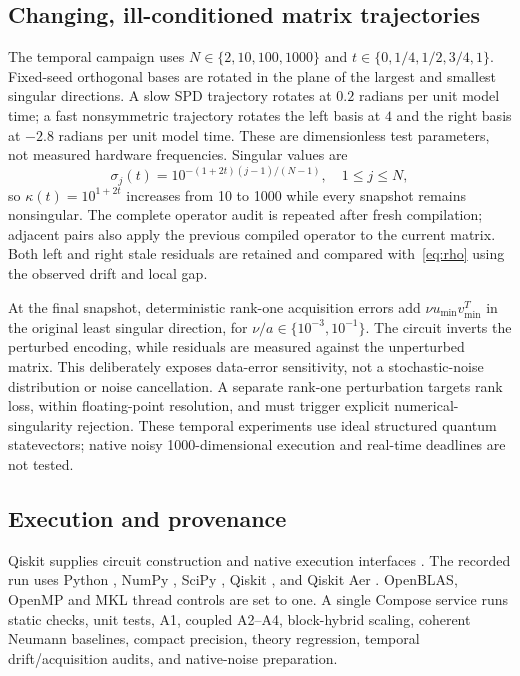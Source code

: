 \documentclass[journal]{IEEEtran}
\begin{document}
\subsection{Changing, ill-conditioned matrix trajectories}
The temporal campaign uses $N\in\{2,10,100,1000\}$ and
$t\in\{0,1/4,1/2,3/4,1\}$. Fixed-seed orthogonal bases are rotated in
the plane of the largest and smallest singular directions. A slow SPD
trajectory rotates at $0.2$ radians per unit model time; a fast
nonsymmetric trajectory rotates the left basis at $4$ and the right basis
at $-2.8$ radians per unit model time. These are dimensionless test
parameters, not measured hardware frequencies. Singular values are
\begin{equation}
 \sigma_j(t)=10^{-(1+2t)(j-1)/(N-1)},\quad 1\leq j\leq N,
 \label{eq:temporalspectrum}
\end{equation}
so $\kappa(t)=10^{1+2t}$ increases from 10 to 1000 while every snapshot
remains nonsingular. The complete operator audit is repeated after fresh
compilation; adjacent pairs also apply the previous compiled operator
to the current matrix. Both left and right stale residuals are retained
and compared with~\eqref{eq:rho} using the observed drift and local gap.

At the final snapshot, deterministic rank-one acquisition errors add
$\nu u_{\min}v_{\min}^T$ in the original least singular direction, for
$\nu/a\in\{10^{-3},10^{-1}\}$.
The circuit inverts the perturbed encoding, while residuals are measured
against the unperturbed matrix. This deliberately exposes data-error
sensitivity, not a stochastic-noise distribution or noise cancellation.
A separate rank-one perturbation targets rank loss, within floating-point
resolution, and must trigger explicit numerical-singularity rejection. These temporal
experiments use ideal structured quantum statevectors; native noisy
1000-dimensional execution and real-time deadlines are not tested.

\subsection{Execution and provenance}
Qiskit supplies circuit construction and native execution interfaces
\cite{qiskit2024}. The recorded run uses Python \PythonVersion{}, NumPy
\VersionNumpy{}, SciPy \VersionScipy{}, Qiskit \VersionQiskit{}, and
Qiskit Aer \VersionQiskitaer{}. OpenBLAS, OpenMP and MKL thread controls are
set to one. A single Compose service runs static checks, \TestCount{} unit
tests, A1, coupled A2--A4, block-hybrid scaling, coherent Neumann baselines,
compact precision, theory regression, temporal drift/acquisition audits,
and native-noise preparation.
\end{document}
